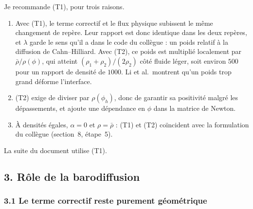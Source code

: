 Je recommande (T1), pour trois raisons.
\begin{enumerate}
  \item Avec (T1), le terme correctif et le flux physique subissent le même changement de repère. Leur rapport est donc identique dans les deux repères, et $\lambda$ garde le sens qu'il a dans le code du collègue : un poids relatif à la diffusion de Cahn--Hilliard. Avec (T2), ce poids est multiplié localement par $\bar{\rho}/\rho(\phi)$, qui atteint $(\rho_1+\rho_2)/(2\rho_2)$ côté fluide léger, soit environ $500$ pour un rapport de densité de $1000$. Li et al.\ montrent qu'un poids trop grand déforme l'interface.
  \item (T2) exige de diviser par $\rho(\phi_h)$, donc de garantir sa positivité malgré les dépassements, et ajoute une dépendance en $\phi$ dans la matrice de Newton.
  \item À densités égales, $\alpha=0$ et $\rho=\bar{\rho}$ : (T1) et (T2) coïncident avec la formulation du collègue (section~8, étape~5).
\end{enumerate}
La suite du document utilise (T1).

\subsection*{3. Rôle de la barodiffusion}

\subsubsection*{3.1 Le terme correctif reste purement géométrique}

